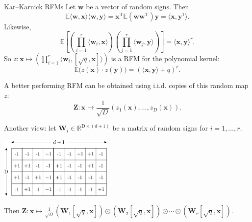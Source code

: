 \documentclass[xcolor=x11names,compress,ignorenonframetext,10pt]{beamer}
\renewcommand{\(}{\begin{columns}}
\renewcommand{\)}{\end{columns}}
\newcommand{\<}[1]{\begin{column}{#1}}
\renewcommand{\>}{\end{column}}
\begin{document}

\begin{frame}{Kar--Karnick RFMs}
  Let $\mathbf{w}$ be a vector of random signs. Then
  \[
    \mathbb{E}\langle \mathbf{w}, \mathbf{x} \rangle \langle \mathbf{w}, \mathbf{y} \rangle = \mathbf{x}^{\mathrm{T}} \mathbb{E} (\mathbf{w} \mathbf{w}^{\mathrm{T}}) \mathbf{y} = \langle \mathbf{x}, \mathbf{y}^1 \rangle. 
  \]
  Likewise,
  \[
    \mathbb{E}\left[ \left(\prod_{i=1}^r \langle \mathbf{w}_i, \mathbf{x} \rangle \right) \left(\prod_{j=1}^r \langle \mathbf{w}_j, \mathbf{y} \rangle \right) \right] = \langle \mathbf{x}, \mathbf{y} \rangle^r.
  \]
  So $z : \mathbf{x} \mapsto \left(\prod_{i=1}^r \langle \mathbf{w}_i, [\sqrt{q}, \mathbf{x}] \rangle \right)$ is a RFM for the polynomial kernel: 
  \[
    \mathbb{E} \big( z(\mathbf{x}) \cdot z(\mathbf{y}) \big) = (\langle \mathbf{x}, \mathbf{y} \rangle + q )^r.
  \]

  A better performing RFM can be obtained using i.i.d. copies of this random map $z$:
  \[
    \textbf{Z} : \mathbf{x} \mapsto \frac{1}{\sqrt{D}} ( z_1(\mathbf{x}), \ldots, z_{D}(\mathbf{x})).
  \]
\end{frame}

\begin{frame}
  Another view: let $\mathbf{W}_i \in \mathbb{R}^{\mathrm{D} \times (d+1)}$ be a matrix of random signs for $i=1,\ldots, r$.
\begin{center}
  \includegraphics[height=1.2in]{figures/craftmaps/alex_illust/kk}
\end{center}
Then
    $\textbf{Z} : \mathbf{x} \mapsto \frac{1}{\sqrt{D}} (\mathbf{W}_1 [\sqrt{q}, \mathbf{x}]) \odot (\mathbf{W}_2 [\sqrt{q}, \mathbf{x}]) \odot \cdots \odot (\mathbf{W}_r [\sqrt{q}, \mathbf{x}]).$
\end{frame}
\end{document}
